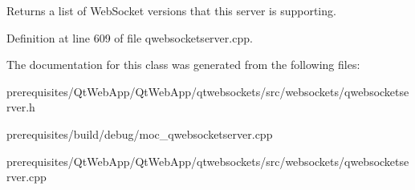 Returns a list of Web\+Socket versions that this server is supporting. 

Definition at line 609 of file qwebsocketserver.\+cpp.



The documentation for this class was generated from the following files\+:\begin{DoxyCompactItemize}
\item 
prerequisites/\+Qt\+Web\+App/\+Qt\+Web\+App/qtwebsockets/src/websockets/qwebsocketserver.\+h\item 
prerequisites/build/debug/moc\+\_\+qwebsocketserver.\+cpp\item 
prerequisites/\+Qt\+Web\+App/\+Qt\+Web\+App/qtwebsockets/src/websockets/qwebsocketserver.\+cpp\end{DoxyCompactItemize}
